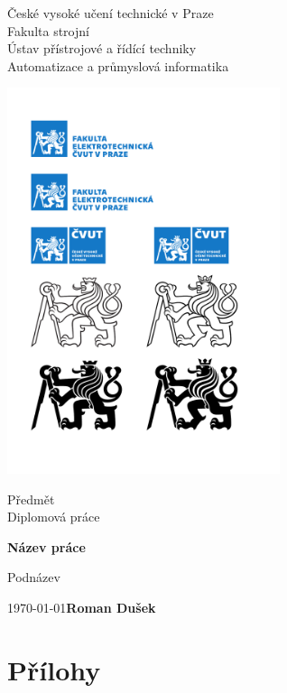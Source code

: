 \documentclass[a4paper]{article}
\begin{document}
\begin{titlepage}
    \begin{center}
        \vspace*{1cm}
        
        \LARGE
        České vysoké učení technické v Praze\\[0.1cm]
       	Fakulta strojní\\[0.4cm]
		\Large
        Ústav přístrojové a řídící techniky\\[0.25cm]
        \large
        Automatizace a průmyslová informatika\\

		\vfill
            
        \includegraphics[width=0.6\textwidth]{lion_white}
                    
        \vfill
            
        Předmět\\[0.5cm]
        \Large
        Diplomová práce

        \vspace{0.8cm}           

        \Huge
        \textbf{Název práce}
            
        \vspace{0.5cm}
        \LARGE
        Podnázev            
        \vspace{3cm}

        \today \hfill \textbf{Roman Dušek}
    \end{center}
\end{titlepage}
\newpage
\tableofcontents
\newpage

\newpage
\nocite{*}
\printbibliography
{}
\newpage

\appendix
\part*{Přílohy}


	
\end{document}
